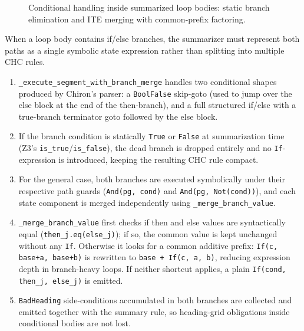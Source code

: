\begin{figure}[h]
\caption{Conditional handling inside summarized loop bodies: static branch elimination and ITE merging with common-prefix factoring.}
\label{fig:opt_cond}
\end{figure}

When a loop body contains if/else branches, the summarizer must represent both paths as a single symbolic state expression rather than splitting into multiple CHC rules.
\begin{enumerate}[leftmargin=1.5em, noitemsep, topsep=2pt]
    \item \texttt{\_execute\_segment\_with\_branch\_merge} handles two conditional shapes produced by Chiron's parser: a \texttt{BoolFalse} skip-goto (used to jump over the else block at the end of the then-branch), and a full structured if/else with a true-branch terminator goto followed by the else block.
    \item If the branch condition is statically \texttt{True} or \texttt{False} at summarization time (Z3's \texttt{is\_true}/\texttt{is\_false}), the dead branch is dropped entirely and no \texttt{If}-expression is introduced, keeping the resulting CHC rule compact.
    \item For the general case, both branches are executed symbolically under their respective path guards (\texttt{And(pg, cond)} and \texttt{And(pg, Not(cond))}), and each state component is merged independently using \texttt{\_merge\_branch\_value}.
    \item \texttt{\_merge\_branch\_value} first checks if then and else values are syntactically equal (\texttt{then\_j.eq(else\_j)}); if so, the common value is kept unchanged without any \texttt{If}. Otherwise it looks for a common additive prefix: \texttt{If(c, base+a, base+b)} is rewritten to \texttt{base + If(c, a, b)}, reducing expression depth in branch-heavy loops. If neither shortcut applies, a plain \texttt{If(cond, then\_j, else\_j)} is emitted.
    \item \texttt{BadHeading} side-conditions accumulated in both branches are collected and emitted together with the summary rule, so heading-grid obligations inside conditional bodies are not lost.
\end{enumerate}

